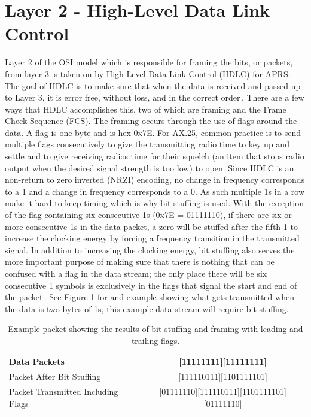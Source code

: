 \section{Layer 2 - High-Level Data Link Control}
Layer 2 of the OSI model which is responsible for framing the bits, or packets, from layer 3 is taken on by High-Level Data Link Control (HDLC) for APRS. The goal of HDLC is to make sure that when the data is received and passed up to Layer 3, it is error free, without loss, and in the correct order\,\cite{Javvin2006}. There are a few ways that HDLC accomplishes this, two of which are framing and the Frame Check Sequence (FCS). The framing occurs through the use of flags around the data. A flag is one byte and is hex 0x7E. For AX.25, common practice is to send multiple flags consecutively to give the transmitting radio time to key up and settle and to give receiving radios time for their squelch (an item that stops radio output when the desired signal strength is too low) to open. Since HDLC is an non-return to zero inverted (NRZI) encoding, no change in frequency corresponds to a 1 and a change in frequency corresponds to a 0. As such multiple 1s in a row make it hard to keep timing which is why bit stuffing is used. With the exception of the flag containing six consecutive 1s (0x7E = 01111110), if there are six or more consecutive 1s in the data packet, a zero will be stuffed after the fifth 1 to increase the clocking energy by forcing a frequency transition in the transmitted signal. In addition to increasing the clocking energy, bit stuffing also serves the more important purpose of making sure that there is nothing that can be confused with a flag in the data stream; the only place there will be six consecutive 1 symbols is exclusively in the flags that signal the start and end of the packet\,\cite{Horzepa1992}. See Figure \ref{bitStuffFrame} for and example showing what gets transmitted when the data is two bytes of 1s, this example data stream will require bit stuffing.
\begin{table}
	\begin{center}
		\begin{tabular}{ | l | c | }
		\hline
			Data Packets & [11111111][11111111] \\ \hline
			Packet After Bit Stuffing & [111110111][1101111101] \\ \hline
			Packet Transmitted Including Flags & [01111110][111110111][1101111101][01111110]\\
			\hline
		\end{tabular}
		\caption[Example of Bit Stuffing and Framing]{Example packet showing the results of bit stuffing and framing with leading and trailing flags.}
		\label{bitStuffFrame}
	\end{center}
\end{table}


